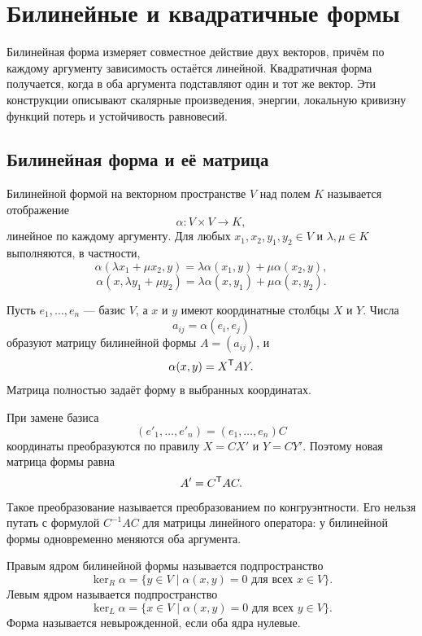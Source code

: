 \section{Билинейные и квадратичные формы}
\label{sec:bilinear-quadratic-forms}

Билинейная форма измеряет совместное действие двух векторов, причём по каждому аргументу зависимость остаётся линейной. Квадратичная форма получается, когда в оба аргумента подставляют один и тот же вектор. Эти конструкции описывают скалярные произведения, энергии, локальную кривизну функций потерь и устойчивость равновесий.

\subsection{Билинейная форма и её матрица}

\begin{definition}
Билинейной формой на векторном пространстве $V$ над полем $K$ называется отображение
\[
\alpha\colon V\times V\to K,
\]
линейное по каждому аргументу. Для любых $x_1,x_2,y_1,y_2\in V$ и $\lambda,\mu\in K$ выполняются, в частности,
\[
\alpha(\lambda x_1+\mu x_2,y)
=\lambda\alpha(x_1,y)+\mu\alpha(x_2,y),
\]
\[
\alpha(x,\lambda y_1+\mu y_2)
=\lambda\alpha(x,y_1)+\mu\alpha(x,y_2).
\]
\end{definition}

Пусть $e_1,\dots,e_n$ --- базис $V$, а $x$ и $y$ имеют координатные столбцы $X$ и $Y$. Числа
\[
a_{ij}=\alpha(e_i,e_j)
\]
образуют матрицу билинейной формы $A=(a_{ij})$, и
\[
\alpha(x,y)=X^{\mathsf{T}}AY.
\]
Матрица полностью задаёт форму в выбранных координатах.

При замене базиса
\[
(e'_1,\dots,e'_n)=(e_1,\dots,e_n)C
\]
координаты преобразуются по правилу $X=CX'$ и $Y=CY'$. Поэтому новая матрица формы равна
\[
A'=C^{\mathsf{T}}AC.
\]
Такое преобразование называется преобразованием по конгруэнтности. Его нельзя путать с формулой $C^{-1}AC$ для матрицы линейного оператора: у билинейной формы одновременно меняются оба аргумента.

\begin{definition}
Правым ядром билинейной формы называется подпространство
\[
\ker_{R}\alpha
=
\{y\in V\mid \alpha(x,y)=0\text{ для всех }x\in V\}.
\]
Левым ядром называется подпространство
\[
\ker_{L}\alpha
=
\{x\in V\mid \alpha(x,y)=0\text{ для всех }y\in V\}.
\]
Форма называется невырожденной, если оба ядра нулевые.
\end{definition}

